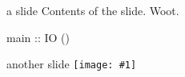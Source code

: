 \documentclass[display=slides, mode=present, paper=screen, style=simple]{powerdot}
\newcommand{\imageslide}[1]{
    \begin{emptyslide}{another slide}
    \texttt{[image: \#1]}
    \end{emptyslide}
}
\begin{document}
\begin{slide}[method=direct]{a slide}
Contents of the slide.
Woot.
\begin{code}
main :: IO ()
\end{code}
\end{slide}

\imageslide{html-tree.eps}
\end{document}
